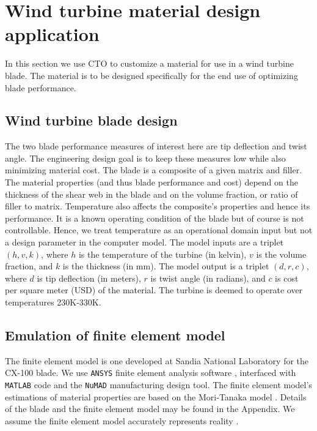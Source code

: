 \documentclass[twocolumn,10pt]{asme2ej}
\begin{document}
\section{Wind turbine material design application}\label{application}

In this section we use CTO to customize a material for use in a wind turbine blade. %
%
The material is to be designed specifically for the end use of optimizing blade performance.
%
 


\subsection{Wind turbine blade design}

The two blade performance measures of interest here are tip deflection and twist angle.
%
The engineering design goal is to keep these measures low while also minimizing material cost.
%
The blade is a composite of a given matrix and filler. 
%
%
The material properties (and thus blade performance and cost) depend on the thickness of the shear web in the blade and on the volume fraction, or ratio of filler to matrix.
%
%
Temperature also affects the composite's properties and hence its performance. It is a known operating condition of the blade but of course is not controllable. Hence, we treat temperature as an operational domain input but not a design parameter in the computer model. 
%
The model inputs are a triplet $(h,v,k)$, where $h$ is the temperature of the turbine (in kelvin), $v$ is the volume fraction, and $k$ is the thickness (in mm). 
%
The model output is a triplet $(d,r,c)$, where $d$ is tip deflection (in meters), $r$ is twist angle (in radians), and $c$ is cost per square meter (USD) of the material.
%
The turbine is deemed to operate over temperatures 230K-330K. 
%


\subsection{Emulation of finite element model}\label{emulator} %
The finite element model is one developed at Sandia National Laboratory for the CX-100 blade. We use \texttt{ANSYS} finite element analysis software \cite{ansys}, interfaced with \texttt{MATLAB} \cite{MATLAB2017} code and the \texttt{NuMAD} \cite{BergResor12} manufacturing design tool.
The finite element model's estimations of material properties are based on the Mori-Tanaka model \cite{Mori1973}.
Details of the blade and the finite element model may be found in the Appendix. We assume the finite element model accurately represents reality \cite{VanBuren2013,VanBuren2014}. 
\end{document}
